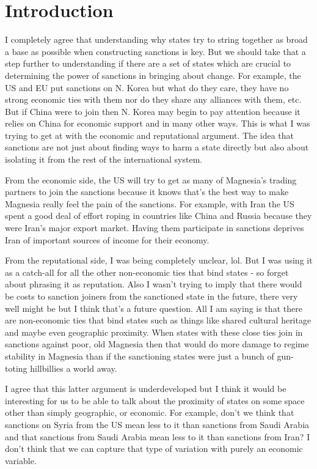 \section{Introduction}
\label{intro}

I completely agree that understanding why states try to string together as broad a base as possible when constructing sanctions is key. But we should take that a step further to understanding if there are a set of states which are crucial to determining the power of sanctions in bringing about change. For example, the US and EU put sanctions on N. Korea but what do they care, they have no strong economic ties with them nor do they share any alliances with them, etc. But if China were to join then N. Korea may begin to pay attention because it relies on China for economic support and in many other ways. This is what I was trying to get at with the economic and reputational argument. The idea that sanctions are not just about finding ways to harm a state directly but also about isolating it from the rest of the international system. 

From the economic side, the US will try to get as many of Magnesia's trading partners to join the sanctions because it knows that's the best way to make Magnesia really feel the pain of the sanctions. For example, with Iran the US spent a good deal of effort roping in countries like China and Russia because they were Iran's major export market. Having them participate in sanctions deprives Iran of important sources of income for their economy. 

From the reputational side, I was being completely unclear, lol. But I was using it as a catch-all for all the other non-economic ties that bind states - so forget about phrasing it as reputation. Also I wasn't trying to imply that there would be costs to sanction joiners from the sanctioned state in the future, there very well might be but I think that's a future question. All I am saying is that there are non-economic ties that bind states such as things like shared cultural heritage and maybe even geographic proximity. When states with these close ties join in sanctions against poor, old Magnesia then that would do more damage to regime stability in Magnesia than if the sanctioning states were just a bunch of gun-toting hillbillies a world away. 

I agree that this latter argument is underdeveloped but I think it would be interesting for us to be able to talk about the proximity of states on some space other than simply geographic, or economic. For example, don't we think that sanctions on Syria from the US mean less to it than sanctions from Saudi Arabia and that sanctions from Saudi Arabia mean less to it than sanctions from Iran? I don't think that we can capture that type of variation with purely an economic variable. 

